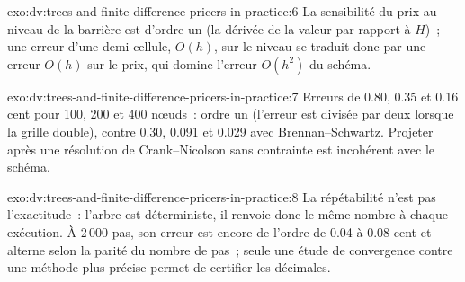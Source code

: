 \begin{solution}{exo:dv:trees-and-finite-difference-pricers-in-practice:6}
La sensibilité du prix au niveau de la barrière est d'ordre un (la dérivée de la valeur par rapport à $H$)~; une erreur d'une demi-cellule, $O(h)$,
sur le niveau se traduit donc par une erreur $O(h)$ sur le prix, qui domine l'erreur $O(h^2)$ du schéma.
\end{solution}

\begin{solution}{exo:dv:trees-and-finite-difference-pricers-in-practice:7}
Erreurs de 0.80, 0.35 et 0.16 cent pour 100, 200 et 400 nœuds~: ordre un (l'erreur est divisée par deux lorsque la grille double), contre 0.30, 0.091 et 0.029 avec
Brennan--Schwartz. Projeter après une résolution de Crank--Nicolson sans contrainte est incohérent avec le schéma.
\end{solution}

\begin{solution}{exo:dv:trees-and-finite-difference-pricers-in-practice:8}
La répétabilité n'est pas l'exactitude~: l'arbre est déterministe, il renvoie donc le même nombre à chaque exécution. À 2\,000 pas, son erreur est encore de l'ordre de 0.04 à
0.08 cent et alterne selon la parité du nombre de pas~; seule une étude de convergence contre une méthode plus précise permet de certifier les décimales.
\end{solution}

